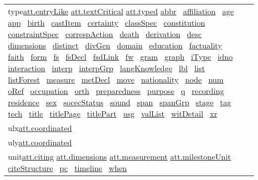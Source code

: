 \begin{longtable}{L{.2\textwidth}P{.8\textwidth}}
type\tabcellsep \hyperref[TEI.att.entryLike]{att.entryLike} \hyperref[TEI.att.textCritical]{att.textCritical} \hyperref[TEI.att.typed]{att.typed} \hyperref[TEI.abbr]{abbr}  \hyperref[TEI.affiliation]{affiliation}  \hyperref[TEI.age]{age}  \hyperref[TEI.app]{app}  \hyperref[TEI.birth]{birth}  \hyperref[TEI.castItem]{castItem}  \hyperref[TEI.certainty]{certainty}  \hyperref[TEI.classSpec]{classSpec}  \hyperref[TEI.constitution]{constitution}  \hyperref[TEI.constraintSpec]{constraintSpec}  \hyperref[TEI.correspAction]{correspAction}  \hyperref[TEI.death]{death}  \hyperref[TEI.derivation]{derivation}  \hyperref[TEI.desc]{desc}  \hyperref[TEI.dimensions]{dimensions}  \hyperref[TEI.distinct]{distinct}  \hyperref[TEI.divGen]{divGen}  \hyperref[TEI.domain]{domain}  \hyperref[TEI.education]{education}  \hyperref[TEI.factuality]{factuality}  \hyperref[TEI.faith]{faith}  \hyperref[TEI.form]{form}  \hyperref[TEI.fs]{fs}  \hyperref[TEI.fsDecl]{fsDecl}  \hyperref[TEI.fsdLink]{fsdLink}  \hyperref[TEI.fw]{fw}  \hyperref[TEI.gram]{gram}  \hyperref[TEI.graph]{graph}  \hyperref[TEI.iType]{iType}  \hyperref[TEI.idno]{idno}  \hyperref[TEI.interaction]{interaction}  \hyperref[TEI.interp]{interp}  \hyperref[TEI.interpGrp]{interpGrp}  \hyperref[TEI.langKnowledge]{langKnowledge}  \hyperref[TEI.lbl]{lbl}  \hyperref[TEI.list]{list}  \hyperref[TEI.listForest]{listForest}  \hyperref[TEI.measure]{measure}  \hyperref[TEI.metDecl]{metDecl}  \hyperref[TEI.move]{move}  \hyperref[TEI.nationality]{nationality}  \hyperref[TEI.node]{node}  \hyperref[TEI.num]{num}  \hyperref[TEI.oRef]{oRef}  \hyperref[TEI.occupation]{occupation}  \hyperref[TEI.orth]{orth}  \hyperref[TEI.preparedness]{preparedness}  \hyperref[TEI.purpose]{purpose}  \hyperref[TEI.q]{q}  \hyperref[TEI.recording]{recording}  \hyperref[TEI.residence]{residence}  \hyperref[TEI.sex]{sex}  \hyperref[TEI.socecStatus]{socecStatus}  \hyperref[TEI.sound]{sound}  \hyperref[TEI.span]{span}  \hyperref[TEI.spanGrp]{spanGrp}  \hyperref[TEI.stage]{stage}  \hyperref[TEI.tag]{tag}  \hyperref[TEI.tech]{tech}  \hyperref[TEI.title]{title}  \hyperref[TEI.titlePage]{titlePage}  \hyperref[TEI.titlePart]{titlePart}  \hyperref[TEI.usg]{usg}  \hyperref[TEI.valList]{valList}  \hyperref[TEI.witDetail]{witDetail}  \hyperref[TEI.xr]{xr} \\
ulx\tabcellsep \hyperref[TEI.att.coordinated]{att.coordinated}\\
uly\tabcellsep \hyperref[TEI.att.coordinated]{att.coordinated}\\
unit\tabcellsep \hyperref[TEI.att.citing]{att.citing} \hyperref[TEI.att.dimensions]{att.dimensions} \hyperref[TEI.att.measurement]{att.measurement} \hyperref[TEI.att.milestoneUnit]{att.milestoneUnit} \hyperref[TEI.citeStructure]{citeStructure}  \hyperref[TEI.pc]{pc}  \hyperref[TEI.timeline]{timeline}  \hyperref[TEI.when]{when} \\

\end{longtable}
